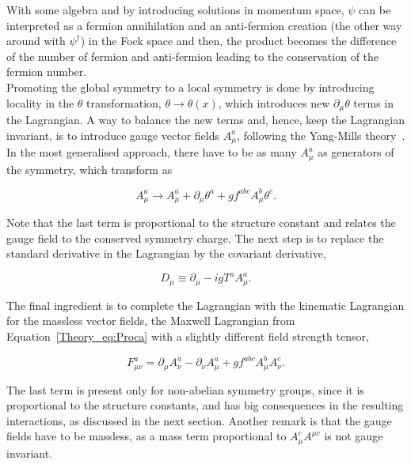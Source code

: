 With some algebra and by introducing solutions in momentum space, $\psi$ can be interpreted as a fermion annihilation and an anti-fermion creation (the other way around with $\psi^\dag$) in the Fock space and then, the product becomes the difference of the number of fermion and anti-fermion leading to the conservation of the fermion number.\\

Promoting the global symmetry to a local symmetry is done by introducing locality in the $\theta$ transformation,
$\theta \rightarrow\theta(x)$, which introduces new $\partial_\mu\theta$ terms in the Lagrangian.
A way to balance the new terms and, hence, keep the Lagrangian invariant, is to introduce gauge vector fields $A_\mu^a$,
following the Yang-Mills theory~\cite{YangMills}. In the most generalised approach, there have to be as many $A_\mu^a$
as generators of the symmetry, which transform as

\begin{equation}
    A_\mu^a \rightarrow A_\mu^a + \partial_\mu\theta^a + gf^{abc}A_\mu^b\theta^c.
\end{equation}

Note that the last term is proportional to the structure constant and relates the gauge field to the conserved symmetry charge.
The next step is to replace the standard derivative in the Lagrangian by the covariant derivative,

\begin{equation}
    D_\mu\equiv\partial_\mu - igT^aA_\mu^a.
\end{equation}

The final ingredient is to complete the Lagrangian with the kinematic Lagrangian for the massless vector fields,
the Maxwell Lagrangian from Equation~\ref{Theory_eq:Proca} with a slightly different field strength tensor,

\begin{equation}
    F_{\mu\nu}^a=\partial_\mu A_\nu^a - \partial_\nu A_\mu^a + gf^{abc}A_\mu^bA_\nu^c.
\end{equation}

The last term is present only for non-abelian symmetry groups, since it is proportional to the structure constants, and has big consequences in the resulting interactions, as discussed in the next section.
Another remark is that the gauge fields have to be massless, as a mass term proportional to $A_\mu^cA^{\mu c}$ is not gauge invariant.\\

